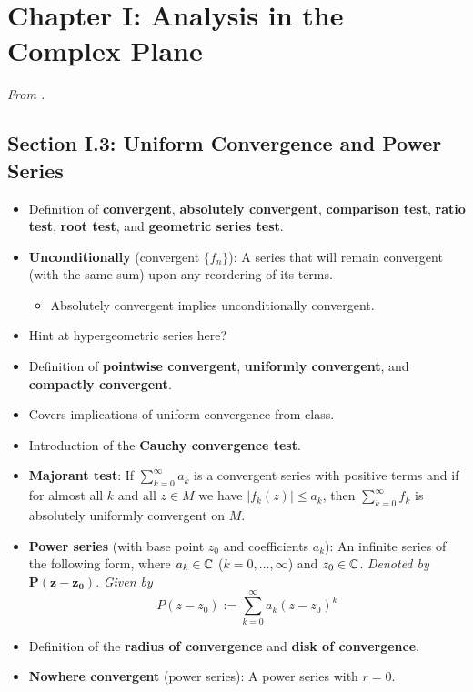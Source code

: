\documentclass[../notes.tex]{subfiles}
\begin{document}
\section{Chapter I: Analysis in the Complex Plane}
\emph{From \textcite{bib:FischerLieb}.}
\subsection*{Section I.3: Uniform Convergence and Power Series}
\begin{itemize}
    \item {}Definition of \textbf{convergent}, \textbf{absolutely convergent}, \textbf{comparison test}, \textbf{ratio test}, \textbf{root test}, and \textbf{geometric series test}.
    \item \textbf{Unconditionally} (convergent $\{f_n\}$): A series that will remain convergent (with the same sum) upon any reordering of its terms.
    \begin{itemize}
        \item Absolutely convergent implies unconditionally convergent.
    \end{itemize}
    \item Hint at hypergeometric series here?
    \item Definition of \textbf{pointwise convergent}, \textbf{uniformly convergent}, and \textbf{compactly convergent}.
    \item Covers implications of uniform convergence from class.
    \item Introduction of the \textbf{Cauchy convergence test}.
    \item \textbf{Majorant test}: If $\sum_{k=0}^\infty a_k$ is a convergent series with positive terms and if for almost all $k$ and all $z\in M$ we have $|f_k(z)|\leq a_k$, then $\sum_{k=0}^\infty f_k$ is absolutely uniformly convergent on $M$.
    \item \textbf{Power series} (with base point $z_0$ and coefficients $a_k$): An infinite series of the following form, where $a_k\in\mathbb{C}$ ($k=0,\dots,\infty$) and $z_0\in\mathbb{C}$. \emph{Denoted by} $\bm{P(z-z_0)}$. \emph{Given by}
    \begin{equation*}
        P(z-z_0) := \sum_{k=0}^\infty a_k(z-z_0)^k
    \end{equation*}
    \item Definition of the \textbf{radius of convergence} and \textbf{disk of convergence}.
    \item \textbf{Nowhere convergent} (power series): A power series with $r=0$.

\end{itemize}
\end{document}
